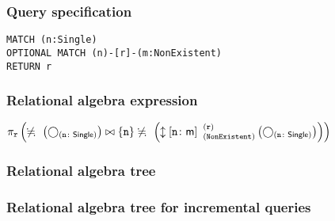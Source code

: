 \subsubsection*{Query specification}

\begin{lstlisting}
MATCH (n:Single)
OPTIONAL MATCH (n)-[r]-(m:NonExistent)
RETURN r
\end{lstlisting}

\subsubsection*{Relational algebra expression}

$\projection{\var{r}} \left(\alldifferent{} \left(\getvertices{n}{Single}\right) \join \{\var{n}\} \alldifferent{} \left(\expandboth{n}{m}{NonExistent}{r}{} \left(\getvertices{n}{Single}\right)\right)\right)$

\subsubsection*{Relational algebra tree}


\subsubsection*{Relational algebra tree for incremental queries}


